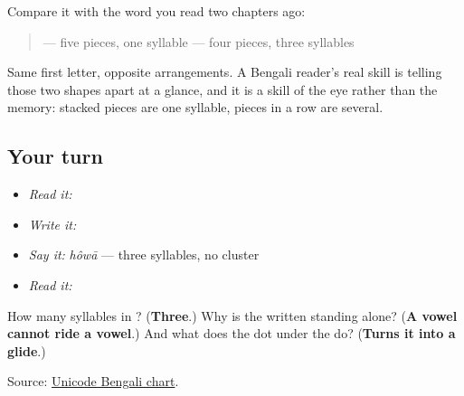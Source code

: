 Compare it with the word you read two chapters ago:

\begin{quote}
\textbf{} — five pieces, one syllable \textbf{} — four pieces, three syllables
\end{quote}

Same first letter, opposite arrangements. A Bengali reader's real skill is telling those two shapes apart at a glance, and it is a skill of the eye rather than the memory: stacked pieces are one syllable, pieces in a row are several.

\subsection*{Your turn}
\begin{itemize}
\raggedright
  \item \emph{Read it:} 
  \item \emph{Write it:} 
  \item \emph{Say it:} \emph{hôwā} — three syllables, no cluster
  \item \emph{Read it:} 
\end{itemize}

\begin{tcolorbox}[breakable,colback=teal!4,colframe=teal!35!black,title={Before you move on}]
How many syllables in \textbf{}? (\textbf{Three}.) Why is the \textbf{} written standing alone? (\textbf{A vowel cannot ride a vowel}.) And what does the dot under the \textbf{} do? (\textbf{Turns it into a glide}.)

Source: \href{https://www.unicode.org/charts/PDF/U0980.pdf}{Unicode Bengali chart}.
\end{tcolorbox}
